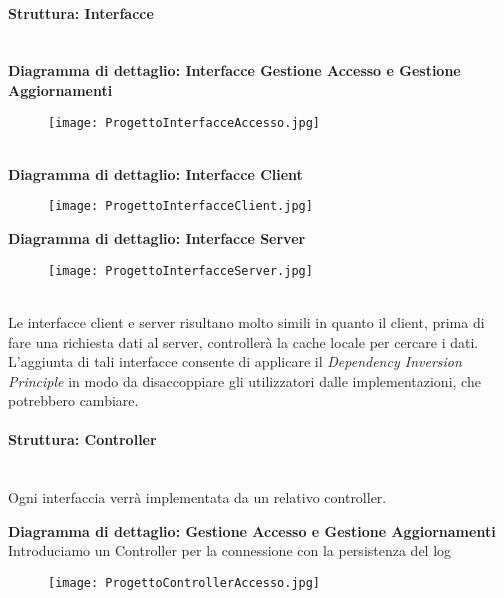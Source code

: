 \paragraph{Struttura: Interfacce}\mbox{}\\
\textbf{Diagramma di dettaglio: Interfacce Gestione Accesso e Gestione Aggiornamenti}
\begin{figure}[h!]
    \begin{center}
        \texttt{[image: ProgettoInterfacceAccesso.jpg]}
    \end{center}
\end{figure}
\\
\textbf{Diagramma di dettaglio: Interfacce Client}
\begin{figure}[h!]
    \begin{center}
        \texttt{[image: ProgettoInterfacceClient.jpg]}
    \end{center}
\end{figure}
\newpage
\textbf{Diagramma di dettaglio: Interfacce Server}
\begin{figure}[h!]
    \begin{center}
        \texttt{[image: ProgettoInterfacceServer.jpg]}
    \end{center}
\end{figure}\\

Le interfacce client e server risultano molto simili in quanto il client, prima di fare una richiesta dati al server, controllerà la cache locale per cercare i dati.
L'aggiunta di tali interfacce consente di applicare il \textit{Dependency Inversion Principle}
in modo da disaccoppiare gli utilizzatori dalle implementazioni, che potrebbero cambiare.


\newpage

\paragraph{Struttura: Controller}\mbox{}\\

Ogni interfaccia verrà implementata da un relativo controller.
\vspace{2em}

\textbf{Diagramma di dettaglio: Gestione Accesso e Gestione Aggiornamenti}
\\Introduciamo un Controller per la connessione con la persistenza del log
\begin{figure}[h!]
    \begin{center}
        \texttt{[image: ProgettoControllerAccesso.jpg]}
    \end{center}
\end{figure}

